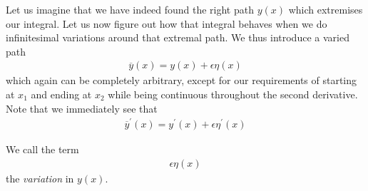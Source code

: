\documentclass[a4paper]{article}
\begin{document}
    Let us imagine that we have indeed found the right path \(y(x)\) which extremises our integral. Let us now figure out how that integral behaves when we do infinitesimal variations around that extremal path. We thus introduce a varied path \begin{align*}
        \overline{y}(x) = y(x) + \epsilon \eta (x)
    \end{align*}
    which again can be completely arbitrary, except for our requirements of starting at \(x_1\) and ending at \(x_2\) while being continuous throughout the second derivative. Note that we immediately see that \begin{align*}
        \overline{y}^{\prime} (x) = y^{\prime} (x) + \epsilon\eta^{\prime}(x)
    \end{align*}

    We call the term \begin{align*}
        \epsilon \eta(x)
    \end{align*}
    the \textit{variation} in \(y(x)\).
    
\end{document}
